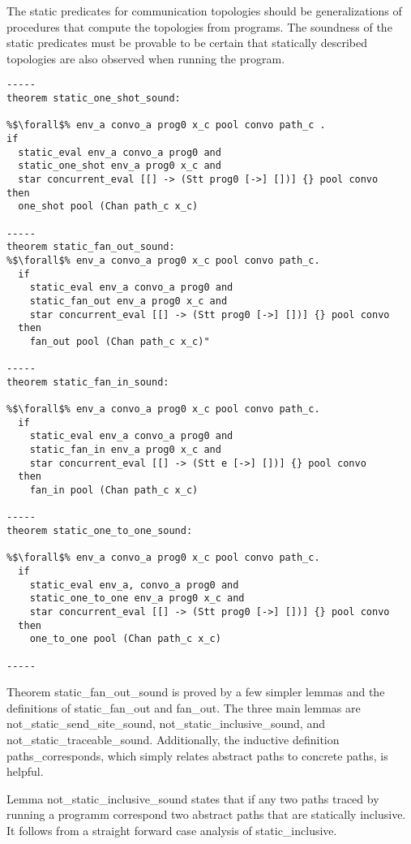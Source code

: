 \documentclass{article}
\begin{document}
The static predicates for communication topologies should be generalizations of procedures that
compute the topologies from programs. The soundness of the static predicates must be provable
to be certain that statically described topologies are also observed when running the program.

\begin{lstlisting}[language=logic, style=codestyle1, escapechar=\%]
-----
theorem static_one_shot_sound: 

%$\forall$% env_a convo_a prog0 x_c pool convo path_c .
if
  static_eval env_a convo_a prog0 and 
  static_one_shot env_a prog0 x_c and 
  star concurrent_eval [[] -> (Stt prog0 [->] [])] {} pool convo
then
  one_shot pool (Chan path_c x_c)

-----
theorem static_fan_out_sound:
%$\forall$% env_a convo_a prog0 x_c pool convo path_c. 
  if 
    static_eval env_a convo_a prog0 and 
    static_fan_out env_a prog0 x_c and 
    star concurrent_eval [[] -> (Stt prog0 [->] [])] {} pool convo
  then
    fan_out pool (Chan path_c x_c)" 

-----
theorem static_fan_in_sound:

%$\forall$% env_a convo_a prog0 x_c pool convo path_c. 
  if
    static_eval env_a convo_a prog0 and 
    static_fan_in env_a prog0 x_c and 
    star concurrent_eval [[] -> (Stt e [->] [])] {} pool convo
  then
    fan_in pool (Chan path_c x_c)

-----
theorem static_one_to_one_sound:

%$\forall$% env_a convo_a prog0 x_c pool convo path_c. 
  if
    static_eval env_a, convo_a prog0 and 
    static_one_to_one env_a prog0 x_c and
    star concurrent_eval [[] -> (Stt prog0 [->] [])] {} pool convo
  then
    one_to_one pool (Chan path_c x_c)

-----

\end{lstlisting}

Theorem static\_fan\_out\_sound is proved by a few simpler lemmas and the definitions
of static\_fan\_out and fan\_out.  The three main lemmas are not\_static\_send\_site\_sound,
not\_static\_inclusive\_sound, and not\_static\_traceable\_sound.  Additionally, the inductive
definition paths\_corresponds, which simply relates abstract paths to concrete paths,
is helpful. 

Lemma not\_static\_inclusive\_sound states that if any two paths traced by running a programm
correspond two abstract paths that are statically inclusive.  It follows from a straight
forward case analysis of static\_inclusive.
\end{document}
